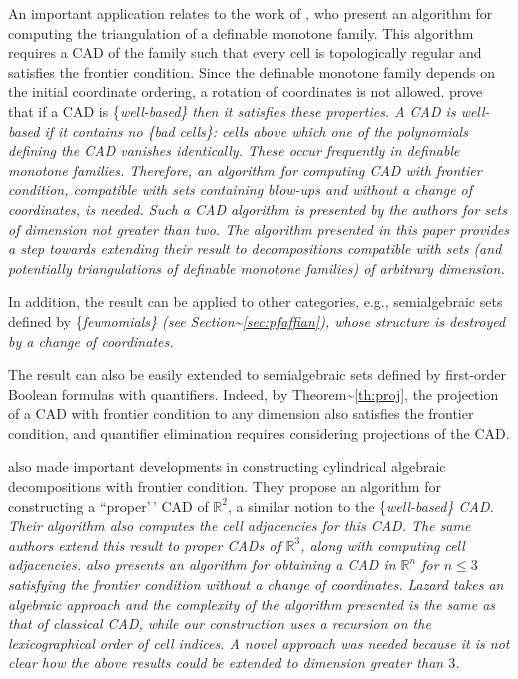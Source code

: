 \documentclass[
]{book}
\theoremstyle{definition}
\theoremstyle{definition}
\theoremstyle{definition}
\theoremstyle{definition}
\theoremstyle{remark}
\begin{document}
An important application relates to the work of \citet{bgv15}, who present an algorithm for computing the triangulation of a definable monotone family. This algorithm requires a CAD of the family such that every cell is topologically regular and satisfies the frontier condition. Since the definable monotone family depends on the initial coordinate ordering, a rotation of coordinates is not allowed. \citet{jhd20} prove that if a CAD is \{\em well-based\} then it satisfies these properties.
A CAD is well-based if it contains no \{\em bad cells\}: cells above which one of the polynomials defining the CAD vanishes identically. These occur frequently in definable monotone families. Therefore, an algorithm for computing CAD with frontier condition, compatible with sets containing blow-ups and without a change of coordinates, is needed. Such a CAD algorithm is presented by the authors for sets of dimension not greater than two. \citep{bgv15} The algorithm presented in this paper provides a step towards extending their result to decompositions compatible with sets (and potentially triangulations of definable monotone families) of arbitrary dimension.

In addition, the result can be applied to other categories, e.g., semialgebraic sets defined by \{\em fewnomials\} (see Section\textasciitilde{}\ref{sec:pfaffian}), whose structure is destroyed by a change of coordinates.

The result can also be easily extended to semialgebraic sets defined by first-order Boolean formulas with quantifiers.
Indeed, by Theorem\textasciitilde{}\ref{th:proj}, the projection of a CAD with frontier condition to any dimension also satisfies the frontier condition, and quantifier elimination requires considering projections of the CAD.

\citet{arnon1984} also made important developments in constructing cylindrical algebraic decompositions with frontier condition. They propose an algorithm for constructing a ``proper'\,' CAD of \(\mathbb{R}^2\), a similar notion to the \{\em well-based\} CAD. Their algorithm also computes the cell adjacencies for this CAD.
The same authors extend this result to proper CADs of \(\mathbb{R}^3\), along with computing cell adjacencies.\citep{arnon1987}
\citet{lazard10} also presents an algorithm for obtaining a CAD in \(\mathbb{R}^n\) for \(n \le 3\) satisfying the frontier condition without a change of coordinates. Lazard takes an algebraic approach and the complexity of the algorithm presented is the same as that of classical CAD, while our construction uses a recursion on the lexicographical order of cell indices. A novel approach was needed because it is not clear how the above results could be extended to dimension greater than \(3\).
\end{document}
